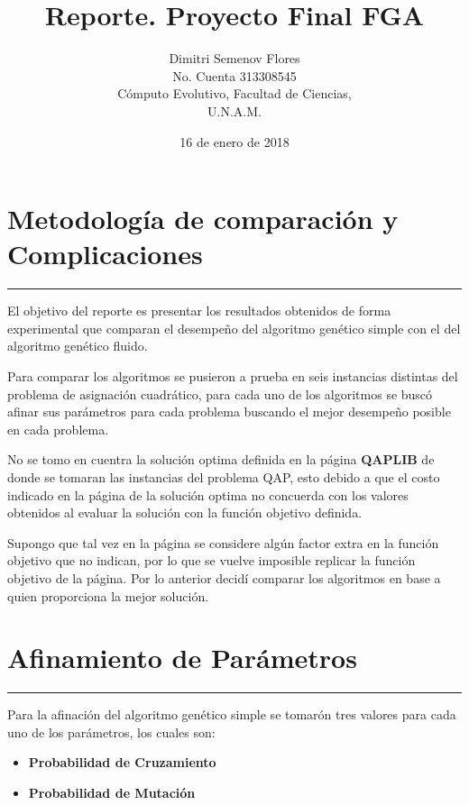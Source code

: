 \documentclass[letterpaper]{article}
\begin{document}
	\title{Reporte. Proyecto Final FGA}
	\author{Dimitri Semenov Flores\\
			No. Cuenta 313308545 \\
	        Cómputo Evolutivo, Facultad de Ciencias,\\
	        U.N.A.M.}
	\date{16 de enero de 2018}
	\maketitle

	\section{Metodología de comparación y Complicaciones}
	
	\noindent\rule{\textwidth}{1pt}
	
	El objetivo del reporte es presentar los resultados obtenidos
	de forma experimental que comparan el desempeño del algoritmo genético
	simple con el del algoritmo genético fluido.


	Para comparar los algoritmos se pusieron a prueba en seis instancias distintas
	del problema de asignación cuadrático, para cada uno de los algoritmos se
	buscó afinar sus parámetros para cada problema buscando el mejor desempeño
	posible en cada problema.


	No se tomo en cuentra la solución optima definida en la página \textbf{QAPLIB}
	de donde se tomaran las instancias del problema QAP, esto debido a que 
	el costo indicado en la página de la solución optima no concuerda con los 
	valores obtenidos al evaluar la solución con la función objetivo definida.

	Supongo que tal vez en la página se considere algún factor extra en la función
	objetivo que no indican, por lo que se vuelve imposible replicar la función
	objetivo de la página. Por lo anterior decidí comparar los algoritmos 
	en base a quien proporciona la mejor solución.

	\section{Afinamiento de Parámetros}

	\noindent\rule{\textwidth}{1pt}

	Para la afinación del algoritmo genético simple se tomarón tres valores para
	cada uno de los parámetros, los cuales son:
		\begin{itemize}
			\item \textbf{Probabilidad de Cruzamiento}
			
			\item \textbf{Probabilidad de Mutación}
		\end{itemize}
		
\end{document}
